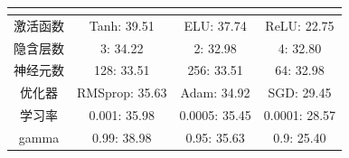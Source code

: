 \begin{table}[!ht]
\begin{tabular}{cccc}
    \multicolumn{4}{c}{}                                            \\ \toprule
    激活函数     & Tanh: 39.51    & ELU: 37.74    & ReLU: 22.75   \\
    隐含层数 & 3: 34.22       & 2: 32.98      & 4: 32.80      \\
    神经元数 & 128: 33.51     & 256: 33.51    & 64: 32.98     \\
    优化器      & RMSprop: 35.63 & Adam: 34.92   & SGD: 29.45    \\
    学习率 & 0.001: 35.98   & 0.0005: 35.45 & 0.0001: 28.57 \\
    gamma          & 0.99: 38.98    & 0.95: 35.63   & 0.9: 25.40    \\ \bottomrule
    \end{tabular}
\end{table}

